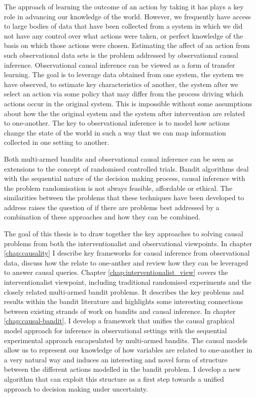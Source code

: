 \documentclass[11pt,a4paper,oneside]{book}
\theoremstyle{plain}
\theoremstyle{definition}
\begin{document}
The approach of learning the outcome of an action by taking it has plays a key role in advancing our knowledge of the world. However, we frequently have access to large bodies of data that have been collected from a system in which we did not have any control over what actions were taken, or perfect knowledge of the basis on which those actions were chosen. Estimating the affect of an action from such observational data sets is the problem addressed by observational causal inference. Observational causal inference can be viewed as a form of transfer learning. The goal is to leverage data obtained from one system, the system we have observed, to estimate key characteristics of another, the system after we select an action via some policy that may differ from the process driving which actions occur in the original system. This is impossible without some assumptions about how the the original system and the system after intervention are related to one-another. The key to observational inference is to model how actions change the state of the world in such a way that we can map information collected in one setting to another. 

Both multi-armed bandits and observational causal inference can be seen as extensions to the concept of randomised controlled trials. Bandit algorithms deal with the sequential nature of the decision making process, causal inference with the problem randomisation is not always feasible, affordable or ethical. The similarities between the problems that these techniques have been developed to address raises the question of if there are problems best addressed by a combination of these approaches and how they can be combined. 

The goal of this thesis is to draw together the key approaches to solving causal problems from both the interventionalist and observational viewpoints. In chapter \ref{chap:causality} I describe key frameworks for causal inference from observational data, discuss how the relate to one-anther and review how they can be leveraged to answer causal queries. Chapter \ref{chap:interventionalist_view} covers the interventionalist viewpoint, including traditional randomised experiments and the closely related multi-armed bandit problems. It describes the key problems and results within the bandit literature and highlights some interesting connections between existing strands of work on bandits and causal inference. In chapter \ref{chap:causal-bandit}, I develop a framework that unifies the causal graphical model approach for inference in observational settings with the sequential experimental approach encapsulated by multi-armed bandits. The causal models allow us to represent our knowledge of how variables are related to one-another in a very natural way and induces an interesting and novel form of structure between the different actions modelled in the bandit problem. I develop a new algorithm that can exploit this structure as a first step towards a unified approach to decision making under uncertainty. 
\end{document}
